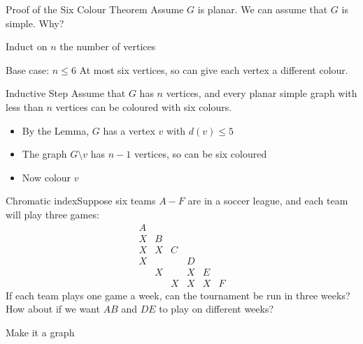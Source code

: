 \documentclass{beamer}
\begin{document}
\begin{frame}{Proof of the Six Colour Theorem}
  Assume $G$ is planar.  We can assume that $G$ is simple.  Why? 

  \begin{block}{Induct on $n$ the number of vertices}
  \end{block}


  \begin{block}{Base case: $n\leq 6$}
    At most six vertices, so can give each vertex a different colour.
  \end{block}

\begin{block}{Inductive Step}
Assume that $G$ has $n$ vertices, and every planar simple graph with less than $n$ vertices can be coloured with six colours. \\
\begin{itemize}
\item By the Lemma, $G$ has a vertex $v$ with $d(v)\leq 5$
\item The graph $G\setminus v$ has $n-1$ vertices, so can be six coloured
\item Now colour $v$
\end{itemize}
\end{block}
 \end{frame}

\begin{frame}{Chromatic index}Suppose six teams $A-F$ are in a soccer league, and each team will play three games:
  $$\begin{array}{cccccc}
A &   &   &   &   &   \\
X & B &   &   &   &   \\
X & X & C &   &   &   \\
X &   &   & D &   &   \\
  & X &   & X & E &   \\
   &   & X & X & X & F
    \end{array}$$
If each team plays one game a week, can the tournament be run in three weeks?  How about if we want $AB$ and $DE$ to play on different weeks?
\begin{block}{Make it a graph}
  \end{block}

\end{frame}
\end{document}
